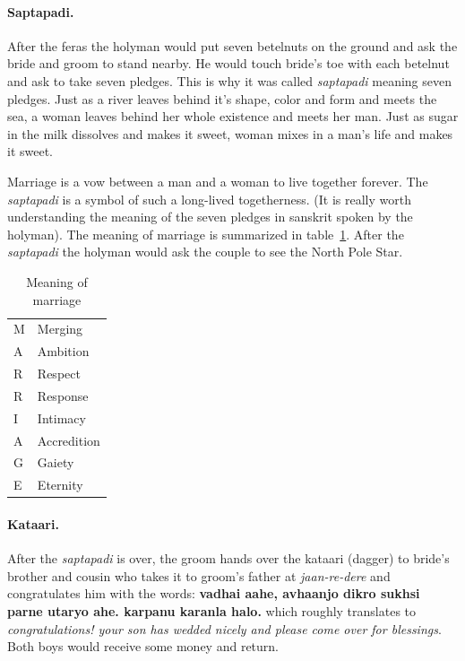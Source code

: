 \paragraph{Saptapadi.} After the feras the holyman would put seven betelnuts on
the ground and ask the bride and groom to stand nearby. He would touch bride's
toe with each betelnut and ask to take seven pledges. This is why it was called
\textit{saptapadi} meaning seven pledges. Just as a river leaves behind it's shape,
color and form and meets the sea, a woman leaves behind her whole
existence and meets her man. Just as sugar in the milk dissolves and
makes it sweet, woman mixes in a man's life and makes it sweet.

Marriage is a vow between a man and a woman to live together forever. The
\textit{saptapadi} is a symbol of such a long-lived togetherness. (It is really
worth understanding the meaning of the seven pledges in sanskrit spoken
by the holyman). The meaning of marriage is summarized in
table~\ref{tbl:marriage}. After the \textit{saptapadi} the holyman would ask the couple to see the North Pole Star.

\begin{table}[h]
\begin{center}
\begin{tabular}{p{2.5cm}p{2.5cm}}
M & Merging \\
A & Ambition \\
R & Respect \\
R & Response \\
I & Intimacy \\
A & Accredition \\
G & Gaiety \\
E & Eternity \\
\end{tabular}
\end{center}
\caption{Meaning of marriage}
\label{tbl:marriage}
\end{table}

\paragraph{Kataari.} After the \textit{saptapadi} is over, the groom hands over
the kataari (dagger) to bride's brother and cousin who takes it to groom's
father at \textit{jaan-re-dere} and congratulates him with the words:
\textbf{vadhai aahe, avhaanjo dikro sukhsi parne utaryo ahe. karpanu karanla
halo.} which roughly translates to \textit{congratulations! your son has
wedded nicely and please come over for blessings}. Both boys would
receive some money and return. 

